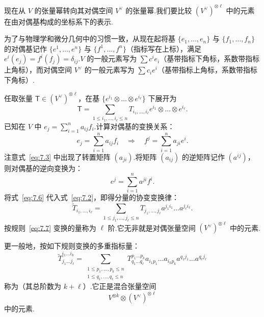 现在从 $V$ 的张量幂转向其对偶空间 $V^\vee$ 的张量幂.我们要比较 $(V^\vee)^{\otimes \ell}$ 中的元素在由对偶基构成的坐标系下的表示.

为了与物理学和微分几何中的习惯一致，从现在起将基 $\{e_1, \dots, e_n\}$ 与 $\{f_1, \dots, f_n\}$ 的对偶基记作 $\{e^1, \dots, e^n\}$ 与 $\{f^1, \dots, f^n\}$（指标写在上标），满足 $e^i(e_j) = f^i(f_j) = \delta_{ij}$.$V$ 的一般元素写为 $\sum c^i e_i$（基带指标下角标，系数带指标上角标），而对偶空间 $V^\vee$ 的一般元素写为 $\sum c_i e^i$（基带指标上角标，系数带指标下角标）.

任取张量 $\mathsf{T} \in (V^\vee)^{\otimes \ell}$，在基 $\{e^{i_1} \otimes \dots \otimes e^{i_\ell}\}$ 下展开为
\begin{equation}
  \mathsf{T} = \sum_{1 \leq i_1, \dots, i_\ell \leq n} T_{i_1, \dots, i_\ell} e^{i_1} \otimes \dots \otimes e^{i_\ell}. \label{eq:7.2}
\end{equation}
已知在 $V$ 中 $e_j = \sum_{i=1}^n a_{ij} f_i$.计算对偶基的变换关系：
\begin{equation}
  e_j = \sum_{i=1}^n a_{ij} f_i \quad\Longrightarrow\quad f^j = \sum_{i=1}^n a_{ji} e^i. \label{eq:7.3}
\end{equation}
注意式~\eqref{eq:7.3} 中出现了转置矩阵 $(a_{ji})$.将矩阵 $(a_{ij})$ 的逆矩阵记作 $(a^{ij})$，则对偶基的逆向变换为：
\begin{equation}
  e^j = \sum_{i=1}^n a^{ji} f^i. \label{eq:7.6}
\end{equation}
将式~\eqref{eq:7.6} 代入式~\eqref{eq:7.2}，即得分量的协变变换律：
\begin{equation}
  \widetilde{T}_{i_1, \dots, i_\ell} = \sum_{1 \leq j_1, \dots, j_\ell \leq n} T_{j_1, \dots, j_\ell} a^{j_1 i_1} \dots a^{j_\ell i_\ell}. \label{eq:7.7}
\end{equation}
按规则~\eqref{eq:7.7} 变换的量称为 $\ell$ 阶.它无非就是对偶张量空间 $(V^\vee)^{\otimes \ell}$ 中的元素.

更一般地，按如下规则变换的多重指标量：
\begin{equation}
  \widetilde{T}_{j_1 \dots j_\ell}^{i_1 \dots i_k} = \sum_{\substack{1 \leq p_1, \dots, p_k \leq n \\ 1 \leq q_1, \dots, q_\ell \leq n}} T_{q_1 \dots q_\ell}^{p_1 \dots p_k} a_{i_1 p_1} \dots a_{i_k p_k} a^{q_1 j_1} \dots a^{q_\ell j_\ell} \label{eq:7.8}
\end{equation}
称为（其总阶数为 $k + \ell$）.它正是混合张量空间
\[
  V^{\otimes k} \otimes (V^\vee)^{\otimes \ell}
\]
中的元素.

